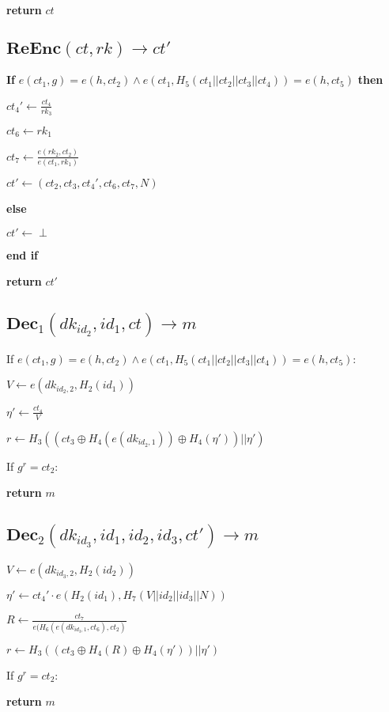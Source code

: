 \documentclass[a4paper]{article}
\begin{document}
\textbf{return} $\textit{ct}$

\subsection{$\textbf{ReEnc}(\textit{ct}, \textit{rk}) \rightarrow \textit{ct}'$}

\textbf{If} $e(\textit{ct}_1, g) = e(h, \textit{ct}_2) \land e(\textit{ct}_1, H_5(\textit{ct}_1 || \textit{ct}_2 || \textit{ct}_3 || \textit{ct}_4)) = e(h, \textit{ct}_5)$ \textbf{then}

\quad$\textit{ct}_4' \gets \frac{\textit{ct}_4}{\textit{rk}_3}$

$\textit{ct}_6 \gets \textit{rk}_1$

\quad$\textit{ct}_7 \gets \frac{e(\textit{rk}_2, \textit{ct}_2)}{e(\textit{ct}_1, \textit{rk}_1)}$

\quad$\textit{ct}' \gets (\textit{ct}_2, \textit{ct}_3, \textit{ct}_4', \textit{ct}_6, \textit{ct}_7, N)$

\textbf{else}

\quad$\textit{ct}' \gets \perp$

\textbf{end if}

\textbf{return} $\textit{ct}'$

\subsection{$\textbf{Dec}_1(\textit{dk}_{\textit{id}_2}, \textit{id}_1, \textit{ct}) \rightarrow m$}

If $e(\textit{ct}_1, g) = e(h, \textit{ct}_2) \land e(\textit{ct}_1, H_5(\textit{ct}_1 || \textit{ct}_2 || \textit{ct}_3 || \textit{ct}_4)) = e(h, \textit{ct}_5)$: 

\quad$V \gets e(\textit{dk}_{\textit{id}_2, 2}, H_2(\textit{id}_1))$

\quad$\eta' \gets \frac{\textit{ct}_4}{V}$

\quad$r \gets H_3((\textit{ct}_3 \oplus H_4(e(\textit{dk}_{\textit{id}_2, 1})) \oplus H_4(\eta')) || \eta')$

\quad If $g^r = \textit{ct}_2$: 

\textbf{return} $m$

\subsection{$\textbf{Dec}_2(\textit{dk}_{\textit{id}_3}, \textit{id}_1, \textit{id}_2, \textit{id}_3, \textit{ct}') \rightarrow m$}

$V \gets e(\textit{dk}_{\textit{id}_3, 2}, H_2(\textit{id}_2))$

$\eta' \gets \textit{ct}_4' \cdot e(H_2(\textit{id}_1), H_7(V || \textit{id}_2 || \textit{id}_3 || N))$

$R \gets \frac{\textit{ct}_7}{e(H_6(e(\textit{dk}_{\textit{id}_3, 1}, \textit{ct}_6), \textit{ct}_2)}$

$r \gets H_3((\textit{ct}_3 \oplus H_4(R) \oplus H_4(\eta')) || \eta')$

If $g^r = \textit{ct}_2$: 

\textbf{return} $m$
\end{document}
